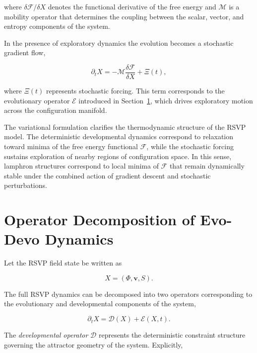 \documentclass[12pt]{article}
\begin{document}
where $\delta \mathcal{F}/\delta X$ denotes the functional derivative of the free energy and $\mathcal{M}$ is a mobility operator that determines the coupling between the scalar, vector, and entropy components of the system.

In the presence of exploratory dynamics the evolution becomes a stochastic gradient flow,

\begin{equation}
\partial_t X
=
-
\mathcal{M}
\frac{\delta \mathcal{F}}{\delta X}
+
\Xi(t),
\label{eq:stochastic_gradient_flow}
\end{equation}

where $\Xi(t)$ represents stochastic forcing. This term corresponds to the evolutionary operator $\mathcal{E}$ introduced in Section~\ref{sec:operators}, which drives exploratory motion across the configuration manifold.

The variational formulation clarifies the thermodynamic structure of the RSVP model. The deterministic developmental dynamics correspond to relaxation toward minima of the free energy functional $\mathcal{F}$, while the stochastic forcing sustains exploration of nearby regions of configuration space. In this sense, lamphron structures correspond to local minima of $\mathcal{F}$ that remain dynamically stable under the combined action of gradient descent and stochastic perturbations.

\section{Operator Decomposition of Evo-Devo Dynamics}
\label{sec:operators}

Let the RSVP field state be written as

\begin{equation}
X = (\Phi,\mathbf{v},S).
\end{equation}

The full RSVP dynamics can be decomposed into two operators corresponding to the evolutionary and developmental components of the system,

\begin{equation}
\partial_t X = \mathcal{D}(X) + \mathcal{E}(X,t).
\label{eq:operator_decomposition}
\end{equation}

The \emph{developmental operator} $\mathcal{D}$ represents the deterministic constraint structure governing the attractor geometry of the system. Explicitly,
\end{document}
